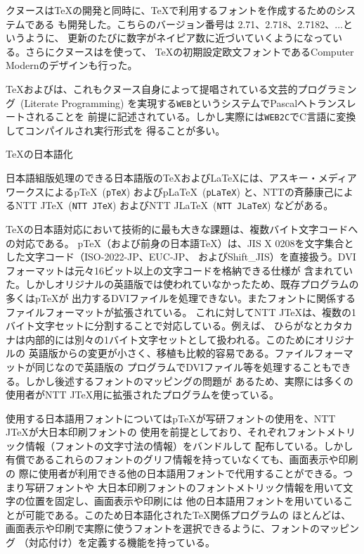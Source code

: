 クヌースは\TeX の開発と同時に、\TeX で利用するフォントを作成するためのシステムである
\mf も開発した。こちらのバージョン番号は 2.71、2.718、2.7182、$\ldots$というように、
更新のたびに数字がネイピア数に近づいていくようになっている。さらにクヌースは\mf を使って、
\TeX の初期設定欧文フォントであるComputer Modernのデザインも行った。

\TeX および\mf は、これもクヌース自身によって提唱されている文芸的プログラミング\ 
(Literate Programming) を実現する{\tt WEB}というシステムでPascalへトランスレートされることを
前提に記述されている。しかし実際には{\tt WEB2C}でC言語に変換してコンパイルされ実行形式を
得ることが多い。

\beginsection \TeX の日本語化

日本語組版処理のできる日本語版の\TeX および\LaTeX には、アスキー・メディアワークスによるp\TeX\ 
({\tt pTeX}) およびp\LaTeX\ ({\tt pLaTeX}) と、NTTの斉藤康己によるNTT J\TeX\ ({\tt NTT JTeX}) およびNTT J\LaTeX\
({\tt NTT JLaTeX}) などがある。

\TeX の日本語対応において技術的に最も大きな課題は、複数バイト文字コードへの対応である。
p\TeX（および前身の日本語\TeX）は、JIS X 0208を文字集合とした文字コード（ISO-2022-JP、EUC-JP、
およびShift\_\thinspace JIS）を直接扱う。DVIフォーマットは元々16ビット以上の文字コードを格納できる仕様が
含まれていた。しかしオリジナルの英語版では使われていなかったため、既存プログラムの多くはp\TeX が
出力するDVIファイルを処理できない。またフォントに関係するファイルフォーマットが拡張されている。
これに対してNTT J\TeX は、複数の1バイト文字セットに分割することで対応している。例えば、
ひらがなとカタカナは内部的には別々の1バイト文字セットとして扱われる。このためにオリジナルの
英語版からの変更が小さく、移植も比較的容易である。ファイルフォーマットが同じなので英語版の
プログラムでDVIファイル等を処理することもできる。しかし後述するフォントのマッピングの問題が
あるため、実際には多くの使用者がNTT J\TeX 用に拡張されたプログラムを使っている。

使用する日本語用フォントについてはp\TeX が写研フォントの使用を、NTT J\TeX が大日本印刷フォントの
使用を前提としており、それぞれフォントメトリック情報（フォントの文字寸法の情報）をバンドルして
配布している。しかし有償であるこれらのフォントのグリフ情報を持っていなくても、画面表示や印刷の
際に使用者が利用できる他の日本語用フォントで代用することができる。つまり写研フォントや
大日本印刷フォントのフォントメトリック情報を用いて文字の位置を固定し、画面表示や印刷には
他の日本語用フォントを用いていることが可能である。このため日本語化された\TeX 関係プログラムの
ほとんどは、画面表示や印刷で実際に使うフォントを選択できるように、フォントのマッピング
（対応付け）を定義する機能を持っている。

